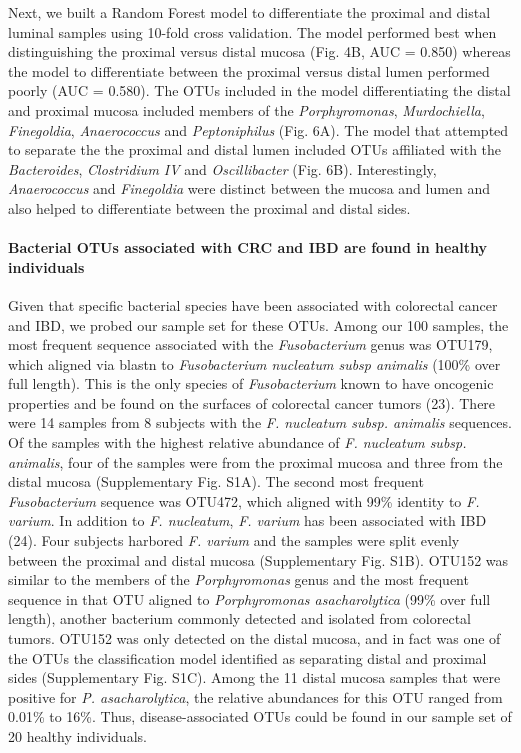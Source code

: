 \documentclass[12pt,]{article}
\let\oldparagraph\paragraph
\renewcommand{\paragraph}[1]{\oldparagraph{#1}\mbox{}}
\begin{document}
Next, we built a Random Forest model to differentiate the proximal and
distal luminal samples using 10-fold cross validation. The model
performed best when distinguishing the proximal versus distal mucosa
(Fig. 4B, AUC = 0.850) whereas the model to differentiate between the
proximal versus distal lumen performed poorly (AUC = 0.580). The OTUs
included in the model differentiating the distal and proximal mucosa
included members of the \emph{Porphyromonas}, \emph{Murdochiella},
\emph{Finegoldia}, \emph{Anaerococcus} and \emph{Peptoniphilus} (Fig.
6A). The model that attempted to separate the the proximal and distal
lumen included OTUs affiliated with the \emph{Bacteroides},
\emph{Clostridium IV} and \emph{Oscillibacter} (Fig. 6B). Interestingly,
\emph{Anaerococcus} and \emph{Finegoldia} were distinct between the
mucosa and lumen and also helped to differentiate between the proximal
and distal sides.

\paragraph{Bacterial OTUs associated with CRC and IBD are found in
healthy
individuals}\label{bacterial-otus-associated-with-crc-and-ibd-are-found-in-healthy-individuals}

Given that specific bacterial species have been associated with
colorectal cancer and IBD, we probed our sample set for these OTUs.
Among our 100 samples, the most frequent sequence associated with the
\emph{Fusobacterium} genus was OTU179, which aligned via blastn to
\emph{Fusobacterium nucleatum subsp animalis} (100\% over full length).
This is the only species of \emph{Fusobacterium} known to have oncogenic
properties and be found on the surfaces of colorectal cancer tumors
(23). There were 14 samples from 8 subjects with the \emph{F. nucleatum
subsp. animalis} sequences. Of the samples with the highest relative
abundance of \emph{F. nucleatum subsp. animalis}, four of the samples
were from the proximal mucosa and three from the distal mucosa
(Supplementary Fig. S1A). The second most frequent \emph{Fusobacterium}
sequence was OTU472, which aligned with 99\% identity to \emph{F.
varium}. In addition to \emph{F. nucleatum}, \emph{F. varium} has been
associated with IBD (24). Four subjects harbored \emph{F. varium} and
the samples were split evenly between the proximal and distal mucosa
(Supplementary Fig. S1B). OTU152 was similar to the members of the
\emph{Porphyromonas} genus and the most frequent sequence in that OTU
aligned to \emph{Porphyromonas asacharolytica} (99\% over full length),
another bacterium commonly detected and isolated from colorectal tumors.
OTU152 was only detected on the distal mucosa, and in fact was one of
the OTUs the classification model identified as separating distal and
proximal sides (Supplementary Fig. S1C). Among the 11 distal mucosa
samples that were positive for \emph{P. asacharolytica}, the relative
abundances for this OTU ranged from 0.01\% to 16\%. Thus,
disease-associated OTUs could be found in our sample set of 20 healthy
individuals.
\end{document}
